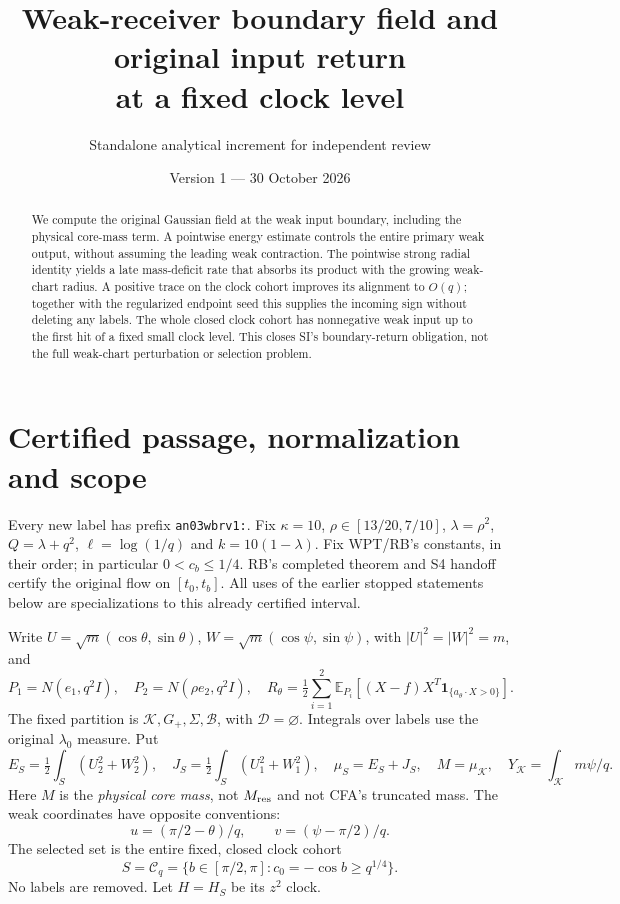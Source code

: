 \documentclass[11pt]{article}
\title{Weak-receiver boundary field and original input return\\
at a fixed clock level}
\author{Standalone analytical increment for independent review}
\date{Version 1 --- 30 October 2026}
\numberwithin{equation}{section}
\theoremstyle{remark}\newtheorem{remark}[theorem]{Remark}
\newcommand{\E}{\mathbb E}\newcommand{\dd}{\,d}
\newcommand{\one}{\mathbf1}\newcommand{\KK}{\mathcal K}
\newcommand{\BB}{\mathcal B}\newcommand{\Gp}{{G_+}}
\newcommand{\Clk}{\mathcal C_q}\newcommand{\eps}{\varepsilon}
\begin{document}
\maketitle
\begin{abstract}
We compute the original Gaussian field at the weak input boundary,
including the physical core-mass term. A pointwise energy estimate
controls the entire primary weak output, without assuming the leading
weak contraction. The pointwise strong radial identity yields a late
mass-deficit rate that absorbs its product with the growing weak-chart
radius. A positive trace on the clock cohort improves its alignment to
$O(q)$; together with the regularized endpoint seed this supplies the
incoming sign without deleting any labels. The whole closed clock
cohort has nonnegative weak input up to the first hit of a fixed small
clock level. This closes SI's boundary-return obligation, not the full
weak-chart perturbation or selection problem.
\end{abstract}

\section{Certified passage, normalization and scope}
\label{an03wbrv1:scope}
Every new label has prefix \texttt{an03wbrv1:}. Fix $\kappa=10$,
$\rho\in[13/20,7/10]$, $\lambda=\rho^2$, $Q=\lambda+q^2$,
$\ell=\log(1/q)$ and $k=10(1-\lambda)$. Fix WPT/RB's constants,
in their order; in particular $0<c_b\le1/4$. RB's completed theorem
and S4 handoff certify the original flow on $[t_0,t_b]$.
All uses of the earlier stopped statements below are specializations
to this already certified interval.

Write $U=\sqrt m(\cos\theta,\sin\theta)$,
$W=\sqrt m(\cos\psi,\sin\psi)$, with $|U|^2=|W|^2=m$, and
\[
 P_1=N(e_1,q^2I),\quad P_2=N(\rho e_2,q^2I),\quad
 R_\theta=\tfrac12\sum_{i=1}^2\E_{P_i}[(X-f)X^T
       \one_{\{a_\theta\cdot X>0\}}].
\]
The fixed partition is $\KK,\Gp,\Sigma,\BB$, with $\mathcal D=\varnothing$.
Integrals over labels use the original $\lambda_0$ measure. Put
\[
 E_S=\tfrac12\int_S(U_2^2+W_2^2),\quad
 J_S=\tfrac12\int_S(U_1^2+W_1^2),\quad \mu_S=E_S+J_S,
 \quad M=\mu_\KK,\quad Y_\KK=\int_\KK m\psi/q.
\]
Here $M$ is the \emph{physical core mass}, not $M_{\rm res}$ and
not CFA's truncated mass. The weak coordinates have opposite conventions:
\begin{equation}
 u=(\pi/2-\theta)/q,\qquad v=(\psi-\pi/2)/q.
 \label{an03wbrv1:coordinates}
\end{equation}
The selected set is the entire fixed, closed clock cohort
\begin{equation}
 S=\Clk=\{b\in[\pi/2,\pi]:c_0=-\cos b\ge q^{1/4}\}.
 \label{an03wbrv1:selected}
\end{equation}
No labels are removed. Let $H=H_S$ be its $z^2$ clock.
\end{document}
